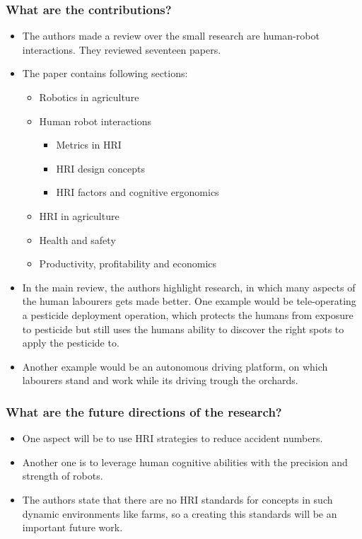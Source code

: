     \subsubsection*{What are the contributions?}
    \begin{itemize}
        \item The authors made a review over the small research are human-robot interactions. They reviewed seventeen papers.
        \item The paper contains following sections: \ \begin{itemize}
            \item Robotics in agriculture
            \item Human robot interactions \ \begin{itemize}
                \item Metrics in HRI
                \item HRI design concepts
                \item HRI factors and cognitive ergonomics
            \end{itemize}
            \item HRI in agriculture
            \item Health and safety
            \item Productivity, profitability and economics
        \end{itemize}
        \item In the main review, the authors highlight research, in which many aspects of the human labourers gets made better. One example would be tele-operating a pesticide deployment operation, which protects the humans from exposure to pesticide but still uses the humans ability to discover the right spots to apply the pesticide to. 
        \item Another example would be an autonomous driving platform, on which labourers stand and work while its driving trough the orchards.
    \end{itemize}
    \subsubsection*{What are the future directions of the research?}
    \begin{itemize}
        \item One aspect will be to use HRI strategies to reduce accident numbers.
        \item Another one is to leverage human cognitive abilities with the precision and strength of robots.
        \item The authors state that there are no HRI standards for concepts in such dynamic environments like farms, so a creating this standards will be an important future work.
    \end{itemize}
